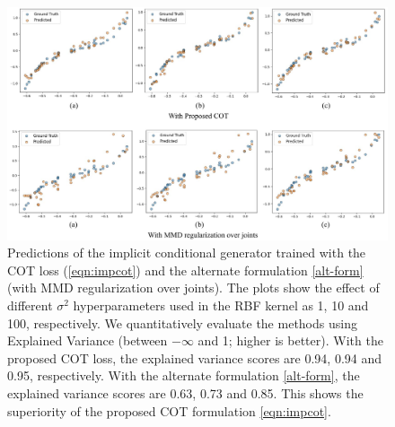 \begin{figure}[t]
\centering
\includegraphics[width=\columnwidth]{chapter-3/images/toy-regr.pdf}
\caption{Predictions of the implicit conditional generator trained with the COT loss (\ref{eqn:impcot}) and the alternate formulation \ref{alt-form} (with MMD regularization over joints). The plots show the effect of different $\sigma^2$ hyperparameters used in the RBF kernel as 1, 10 and 100, respectively. We quantitatively evaluate the methods using Explained Variance (between $-\infty$ and 1; higher is better). With the proposed COT loss, the explained variance scores are 0.94, 0.94 and 0.95, respectively. With the alternate formulation \ref{alt-form}, the explained variance scores are 0.63, 0.73 and 0.85. This shows the superiority of the proposed COT formulation \ref{eqn:impcot}.}
\label{supp:reg}
\end{figure}


